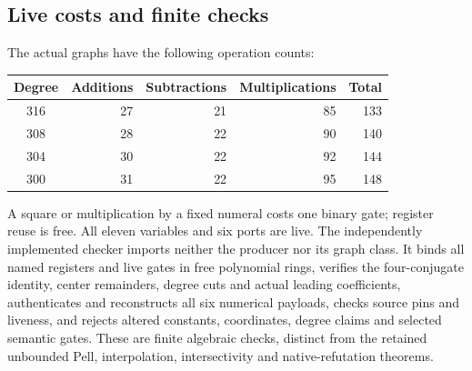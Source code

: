 \subsection{Live costs and finite checks}
The actual graphs have the following operation counts:
\begin{center}\small
\begin{tabular}{@{}crrrr@{}}\toprule
Degree & Additions & Subtractions & Multiplications & Total\\\midrule
316&27&21&85&133\\
308&28&22&90&140\\
304&30&22&92&144\\
300&31&22&95&148\\\bottomrule
\end{tabular}
\end{center}
A square or multiplication by a fixed numeral costs one binary gate;
register reuse is free. All eleven variables and six ports are live.
The independently implemented checker imports neither the producer nor
its graph class. It binds all named registers and live gates in free
polynomial rings, verifies the four-conjugate identity, center remainders,
degree cuts and actual leading coefficients, authenticates and reconstructs
all six numerical payloads, checks source pins and liveness, and rejects
altered constants, coordinates, degree claims and selected semantic gates.
These are finite algebraic checks, distinct from the retained unbounded
Pell, interpolation, intersectivity and native-refutation theorems.

